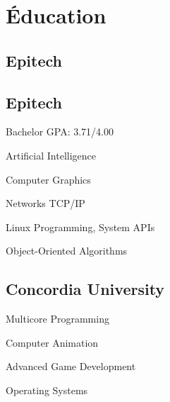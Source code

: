 \documentclass[]{resume-openfont}
\begin{document}
\noindent%
\begin{minipage}[t]{0.31\textwidth}



\section{Éducation}

\subsection{Epitech}
\subtitle{Master en Informatique}
\sectionsep

\subsection{Epitech}
\subtitle{Bachelor en Informatique}
Bachelor GPA: 3.71/4.00
\vspace{0.8\topsep} %
\begin{coursework}
\item Artificial Intelligence
\item Computer Graphics
\item Networks TCP/IP
\item Linux Programming, System APIs
\item Object-Oriented Algorithms
\end{coursework}
\sectionsep

\subsection{Concordia University}
\subtitle{Étudiant international en informatique, niveau master}
\begin{coursework}
\item Multicore Programming
\item Computer Animation
\item Advanced Game Development
\item Operating Systems
\end{coursework}



\end{minipage}
\end{document}
